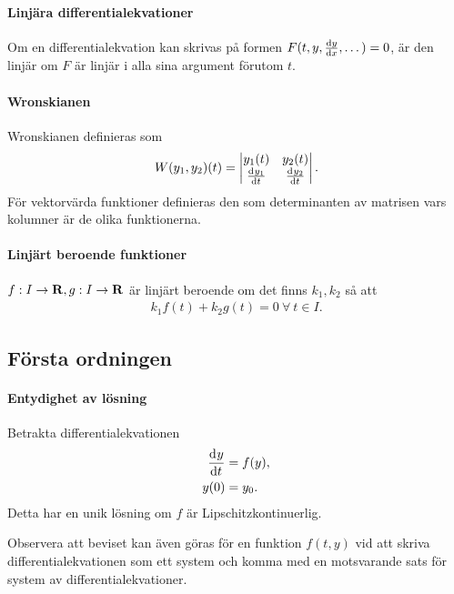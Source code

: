\paragraph{Linjära differentialekvationer}
Om en differentialekvation kan skrivas på formen $F(t, y, \dv{y}{x}, \dots) = 0$, är den linjär om $F$ är linjär i alla sina argument förutom $t$.

\paragraph{Wronskianen}
Wronskianen definieras som
\begin{align*}
	W(y_1, y_2)(t) = \mdet{y_{1}(t) & y_{2}(t) \\ \deval{y_{1}}{t}{t} & \deval{y_{2}}{t}{t}}.
\end{align*}
För vektorvärda funktioner definieras den som determinanten av matrisen vars kolumner är de olika funktionerna. 

\paragraph{Linjärt beroende funktioner}
$f: I\to\mathbf{R}, g: I\to\mathbf{R}$ är linjärt beroende om det finns $k_{1}, k_{2}$ så att
\begin{align*}
	k_{1}f(t) + k_{2}g(t) = 0\ \forall\ t\in I.
\end{align*}

\subsection{Första ordningen}

\paragraph{Entydighet av lösning}
Betrakta differentialekvationen
\begin{align*}
	\dv[]{y}{t} (t) &= f(y), \\
	y(0)            &= y_0.
\end{align*}
Detta har en unik lösning om $f$ är Lipschitzkontinuerlig.

Observera att beviset kan även göras för en funktion $f(t, y)$ vid att skriva differentialekvationen som ett system och komma med en motsvarande sats för system av differentialekvationer.


